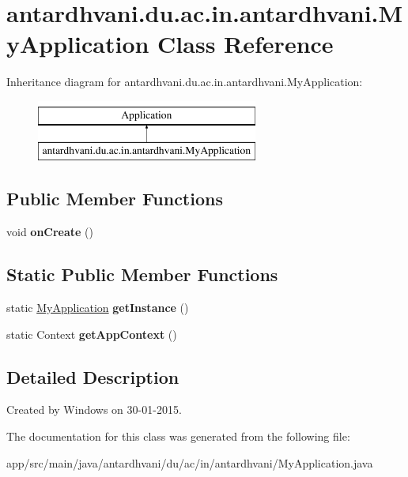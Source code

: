 \hypertarget{classantardhvani_1_1du_1_1ac_1_1in_1_1antardhvani_1_1_my_application}{}\section{antardhvani.\+du.\+ac.\+in.\+antardhvani.\+My\+Application Class Reference}
\label{classantardhvani_1_1du_1_1ac_1_1in_1_1antardhvani_1_1_my_application}
Inheritance diagram for antardhvani.\+du.\+ac.\+in.\+antardhvani.\+My\+Application\+:\begin{figure}[H]
\begin{center}
\leavevmode
\includegraphics[height=2.000000cm]{classantardhvani_1_1du_1_1ac_1_1in_1_1antardhvani_1_1_my_application}
\end{center}
\end{figure}
\subsection*{Public Member Functions}
\begin{DoxyCompactItemize}
\item 
\hypertarget{classantardhvani_1_1du_1_1ac_1_1in_1_1antardhvani_1_1_my_application_a70bd855b288dad9785e528aa9512fdd5}{}void {\bfseries on\+Create} ()\label{classantardhvani_1_1du_1_1ac_1_1in_1_1antardhvani_1_1_my_application_a70bd855b288dad9785e528aa9512fdd5}

\end{DoxyCompactItemize}
\subsection*{Static Public Member Functions}
\begin{DoxyCompactItemize}
\item 
\hypertarget{classantardhvani_1_1du_1_1ac_1_1in_1_1antardhvani_1_1_my_application_a0813a0922f64afefe9c8e717aa4c62e3}{}static \hyperlink{classantardhvani_1_1du_1_1ac_1_1in_1_1antardhvani_1_1_my_application}{My\+Application} {\bfseries get\+Instance} ()\label{classantardhvani_1_1du_1_1ac_1_1in_1_1antardhvani_1_1_my_application_a0813a0922f64afefe9c8e717aa4c62e3}

\item 
\hypertarget{classantardhvani_1_1du_1_1ac_1_1in_1_1antardhvani_1_1_my_application_a6ae3f110590ccedaffef93f9eacf0561}{}static Context {\bfseries get\+App\+Context} ()\label{classantardhvani_1_1du_1_1ac_1_1in_1_1antardhvani_1_1_my_application_a6ae3f110590ccedaffef93f9eacf0561}

\end{DoxyCompactItemize}


\subsection{Detailed Description}
Created by Windows on 30-\/01-\/2015. 

The documentation for this class was generated from the following file\+:\begin{DoxyCompactItemize}
\item 
app/src/main/java/antardhvani/du/ac/in/antardhvani/My\+Application.\+java\end{DoxyCompactItemize}
